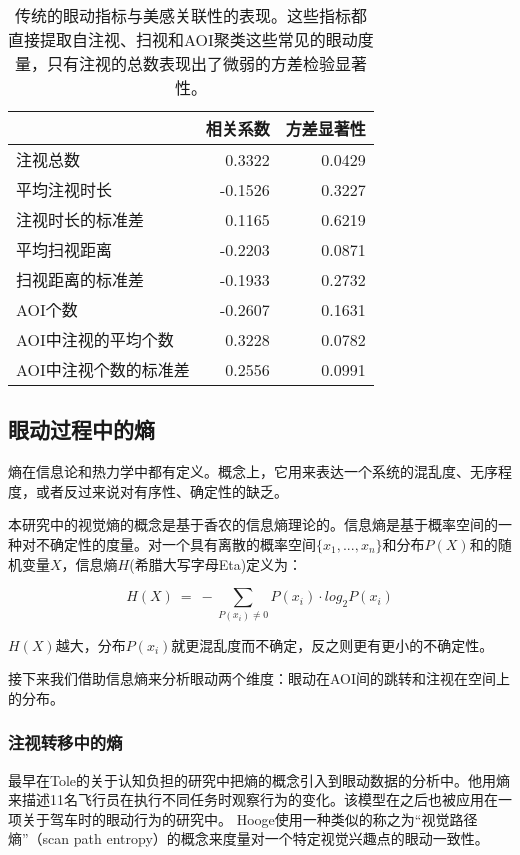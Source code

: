\documentclass[master, fontset=mac, openany, oneside, zihao=-4]{sjtuthesis}
\begin{document}
\begin{table}[H]
  \label{tab:traditional}
  \centering
  \begin{tabular}{lrr}
    \hline
     &相关系数 & 方差显著性 \\
    \hline
    注视总数 & 0.3322 & 0.0429 \\
    平均注视时长 & -0.1526 & 0.3227 \\
    注视时长的标准差 & 0.1165 & 0.6219 \\
    平均扫视距离 & -0.2203 & 0.0871 \\
    扫视距离的标准差 & -0.1933 & 0.2732 \\
    AOI个数 & -0.2607 & 0.1631 \\
    AOI中注视的平均个数 & 0.3228 & 0.0782 \\
    AOI中注视个数的标准差 & 0.2556 & 0.0991 \\
    \hline
  \end{tabular}
  \caption{传统的眼动指标与美感关联性的表现。这些指标都直接提取自注视、扫视和AOI聚类这些常见的眼动度量，只有注视的总数表现出了微弱的方差检验显著性。}
\end{table}


\subsection{眼动过程中的熵}
熵在信息论和热力学中都有定义。概念上，它用来表达一个系统的混乱度、无序程度，或者反过来说对有序性、确定性的缺乏。

本研究中的视觉熵的概念是基于香农的信息熵理论的。信息熵是基于概率空间的一种对不确定性的度量。对一个具有离散的概率空间$\{x_1, ..., x_n\}$和分布$P(X)$和的随机变量$X$，信息熵$H$(希腊大写字母Eta)定义为：

$$H(X)~=~-\sum_{P(x_i)\neq 0} P(x_i)\cdot log_{2}P(x_i)$$

$H(X)$越大，分布$P(x_i)$就更混乱度而不确定，反之则更有更小的不确定性。

接下来我们借助信息熵来分析眼动两个维度：眼动在AOI间的跳转和注视在空间上的分布。

\subsubsection{注视转移中的熵}
最早在Tole的关于认知负担的研究中把熵的概念引入到眼动数据的分析中\cite{Tole1983}。他用熵来描述11名飞行员在执行不同任务时观察行为的变化。该模型在之后也被应用在一项关于驾车时的眼动行为的研究\cite{Gilland2008}中。
Hooge使用一种类似的称之为“视觉路径熵”（scan path entropy）的概念来度量对一个特定视觉兴趣点的眼动一致性\cite{Hooge2013}。
\end{document}
